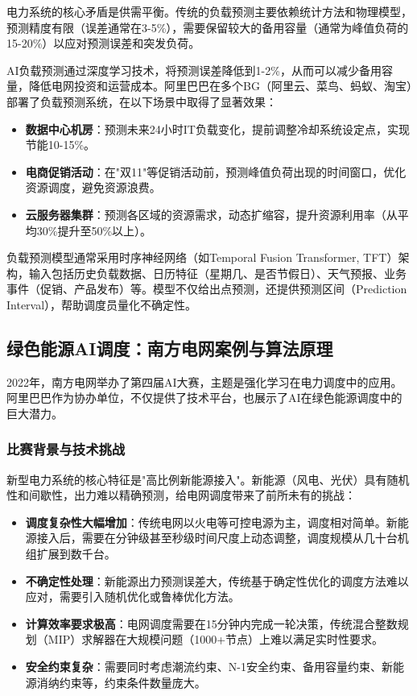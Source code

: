 电力系统的核心矛盾是供需平衡。传统的负载预测主要依赖统计方法和物理模型，预测精度有限（误差通常在3-5\%），需要保留较大的备用容量（通常为峰值负荷的15-20\%）以应对预测误差和突发负荷。

AI负载预测通过深度学习技术，将预测误差降低到1-2\%，从而可以减少备用容量，降低电网投资和运营成本。阿里巴巴在多个BG（阿里云、菜鸟、蚂蚁、淘宝）部署了负载预测系统，在以下场景中取得了显著效果：

\begin{itemize}
    \item \textbf{数据中心机房}：预测未来24小时IT负载变化，提前调整冷却系统设定点，实现节能10-15\%。

    \item \textbf{电商促销活动}：在"双11"等促销活动前，预测峰值负荷出现的时间窗口，优化资源调度，避免资源浪费。

    \item \textbf{云服务器集群}：预测各区域的资源需求，动态扩缩容，提升资源利用率（从平均30\%提升至50\%以上）。
\end{itemize}

负载预测模型通常采用时序神经网络（如Temporal Fusion Transformer, TFT）架构，输入包括历史负载数据、日历特征（星期几、是否节假日）、天气预报、业务事件（促销、产品发布）等。模型不仅给出点预测，还提供预测区间（Prediction Interval），帮助调度员量化不确定性。

\subsection{绿色能源AI调度：南方电网案例与算法原理}

2022年，南方电网举办了第四届AI大赛，主题是强化学习在电力调度中的应用。阿里巴巴作为协办单位，不仅提供了技术平台，也展示了AI在绿色能源调度中的巨大潜力。

\subsubsection{比赛背景与技术挑战}

新型电力系统的核心特征是"高比例新能源接入"。新能源（风电、光伏）具有随机性和间歇性，出力难以精确预测，给电网调度带来了前所未有的挑战：

\begin{itemize}
    \item \textbf{调度复杂性大幅增加}：传统电网以火电等可控电源为主，调度相对简单。新能源接入后，需要在分钟级甚至秒级时间尺度上动态调整，调度规模从几十台机组扩展到数千台。

    \item \textbf{不确定性处理}：新能源出力预测误差大，传统基于确定性优化的调度方法难以应对，需要引入随机优化或鲁棒优化方法。

    \item \textbf{计算效率要求极高}：电网调度需要在15分钟内完成一轮决策，传统混合整数规划（MIP）求解器在大规模问题（1000+节点）上难以满足实时性要求。

    \item \textbf{安全约束复杂}：需要同时考虑潮流约束、N-1安全约束、备用容量约束、新能源消纳约束等，约束条件数量庞大。
\end{itemize}

